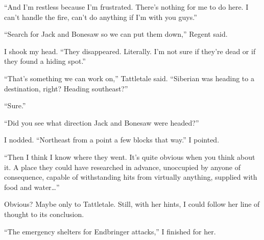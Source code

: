 ``And I'm restless because I'm frustrated.  There's nothing for me to do here.  I can't handle the fire, can't do anything if I'm with you guys.''



``Search for Jack and Bonesaw so we can put them down,'' Regent said.



I shook my head.  ``They disappeared.  Literally.  I'm not sure if they're dead or if they found a hiding spot.''



``That's something we can work on,'' Tattletale said.  ``Siberian was heading to a destination, right?  Heading southeast?''



``Sure.''



``Did you see what direction Jack and Bonesaw were headed?''



I nodded.  ``Northeast from a point a few blocks that way.''  I pointed.



``Then I think I know where they went.  It's quite obvious when you think about it.  A place they could have researched in advance, unoccupied by anyone of consequence, capable of withstanding hits from virtually anything, supplied with food and water\ldots''



Obvious?  Maybe only to Tattletale.  Still, with her hints, I could follow her line of thought to its conclusion.



``The emergency shelters for Endbringer attacks,''  I finished for her.





